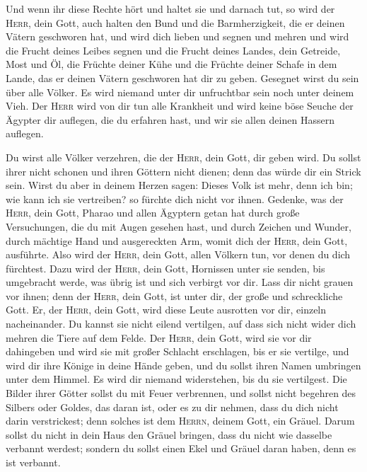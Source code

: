  Und wenn ihr diese Rechte hört und haltet sie und
darnach tut, so wird der \textsc{Herr}, dein Gott, auch halten den Bund
und die Barmherzigkeit, die er deinen Vätern geschworen hat,
 und wird dich lieben und segnen und mehren und wird die
Frucht deines Leibes segnen und die Frucht deines Landes, dein Getreide,
Most und Öl, die Früchte deiner Kühe und die Früchte deiner Schafe in
dem Lande, das er deinen Vätern geschworen hat dir zu geben.
 Gesegnet wirst du sein über alle Völker. Es wird niemand
unter dir unfruchtbar sein noch unter deinem Vieh.  Der
\textsc{Herr} wird von dir tun alle Krankheit und wird keine böse Seuche
der Ägypter dir auflegen, die du erfahren hast, und wir sie allen deinen
Hassern auflegen.

 Du wirst alle Völker verzehren, die der \textsc{Herr},
dein Gott, dir geben wird. Du sollst ihrer nicht schonen und ihren
Göttern nicht dienen; denn das würde dir ein Strick sein.
 Wirst du aber in deinem Herzen sagen: Dieses Volk ist
mehr, denn ich bin; wie kann ich sie vertreiben?  so
fürchte dich nicht vor ihnen. Gedenke, was der \textsc{Herr}, dein Gott,
Pharao und allen Ägyptern getan hat  durch große
Versuchungen, die du mit Augen gesehen hast, und durch Zeichen und
Wunder, durch mächtige Hand und ausgereckten Arm, womit dich der
\textsc{Herr}, dein Gott, ausführte. Also wird der \textsc{Herr}, dein
Gott, allen Völkern tun, vor denen du dich fürchtest. 
Dazu wird der \textsc{Herr}, dein Gott, Hornissen unter sie senden, bis
umgebracht werde, was übrig ist und sich verbirgt vor dir.
 Lass dir nicht grauen vor ihnen; denn der \textsc{Herr},
dein Gott, ist unter dir, der große und schreckliche Gott.
 Er, der \textsc{Herr}, dein Gott, wird diese Leute
ausrotten vor dir, einzeln nacheinander. Du kannst sie nicht eilend
vertilgen, auf dass sich nicht wider dich mehren die Tiere auf dem
Felde.  Der \textsc{Herr}, dein Gott, wird sie vor dir
dahingeben und wird sie mit großer Schlacht erschlagen, bis er sie
vertilge,  und wird dir ihre Könige in deine Hände geben,
und du sollst ihren Namen umbringen unter dem Himmel. Es wird dir
niemand widerstehen, bis du sie vertilgest.  Die Bilder
ihrer Götter sollst du mit Feuer verbrennen, und sollst nicht begehren
des Silbers oder Goldes, das daran ist, oder es zu dir nehmen, dass du
dich nicht darin verstrickest; denn solches ist dem \textsc{Herrn},
deinem Gott, ein Gräuel.  Darum sollst du nicht in dein
Haus den Gräuel bringen, dass du nicht wie dasselbe verbannt werdest;
sondern du sollst einen Ekel und Gräuel daran haben, denn es ist
verbannt.

